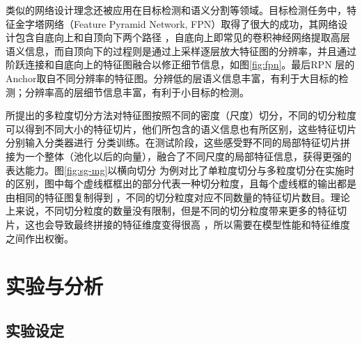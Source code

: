 类似的网络设计理念还被应用在目标检测和语义分割等领域。目标检测任务中，特征金字塔网络（Feature Pyramid Network, FPN）取得了很大的成功\cite{lin2017feature}，其网络设计包含自底向上和自顶向下两个路径
，自底向上即常见的卷积神经网络提取高层语义信息，而自顶向下的过程则是通过上采样逐层放大特征图的分辨率，并且通过阶跃连接和自底向上的特征图融合以修正细节信息，如图\ref{fig:fpn}。最后RPN
层的Anchor取自不同分辨率的特征图。分辨低的层语义信息丰富，有利于大目标的检测；分辨率高的层细节信息丰富，有利于小目标的检测。


所提出的多粒度切分方法对特征图按照不同的密度（尺度）切分，不同的切分粒度可以得到不同大小的特征切片，他们所包含的语义信息也有所区别，这些特征切片分别输入分类器进行
分类训练。在测试阶段，这些感受野不同的局部特征切片拼接为一个整体（池化以后的向量），融合了不同尺度的局部特征信息，获得更强的表达能力。图\ref{fig:sg-mg}以横向切分
为例对比了单粒度切分与多粒度切分在实施时的区别，图中每个虚线框框出的部分代表一种切分粒度，且每个虚线框的输出都是由相同的特征图复制得到
，不同的切分粒度对应不同数量的特征切片数目。理论上来说，不同切分粒度的数量没有限制，但是不同的切分粒度带来更多的特征切片，这也会导致最终拼接的特征维度变得很高
，所以需要在模型性能和特征维度之间作出权衡。

\section{实验与分析}
\subsection{实验设定}
